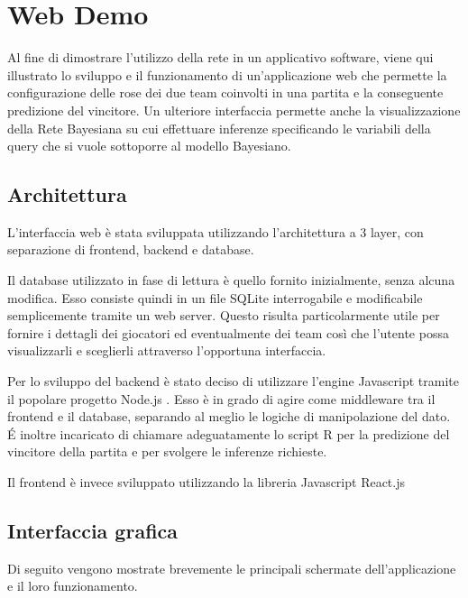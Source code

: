 \documentclass[hidelinks, 12pt]{article}
\begin{document}
\clearpage



\section{Web Demo}
\label{sec:ui}

Al fine di dimostrare l'utilizzo della rete in un applicativo software, viene qui illustrato lo sviluppo e il funzionamento di un'applicazione web che permette la configurazione delle rose dei due team coinvolti in una partita e la conseguente predizione del vincitore. Un ulteriore interfaccia permette anche la visualizzazione della Rete Bayesiana su cui effettuare inferenze specificando le variabili della query che si vuole sottoporre al modello Bayesiano.



\subsection{Architettura}

L'interfaccia web è stata sviluppata utilizzando l'architettura a 3 layer, con separazione di frontend, backend e database.

Il database utilizzato in fase di lettura è quello fornito inizialmente, senza alcuna modifica. Esso consiste quindi in un file SQLite interrogabile e modificabile semplicemente tramite un web server. Questo risulta particolarmente utile per fornire i dettagli dei giocatori ed eventualmente dei team così che l'utente possa visualizzarli e sceglierli attraverso l'opportuna interfaccia.

Per lo sviluppo del backend è stato deciso di utilizzare l'engine Javascript tramite il popolare progetto Node.js \cite{site:nodejs}. Esso è in grado di agire come middleware tra il frontend e il database, separando al meglio le logiche di manipolazione del dato. \'E inoltre incaricato di chiamare adeguatamente lo script R per la predizione del vincitore della partita e per svolgere le inferenze richieste.

Il frontend è invece sviluppato utilizzando la libreria Javascript React.js \cite{site:react}



\subsection{Interfaccia grafica}

Di seguito vengono mostrate brevemente le principali schermate dell'applicazione e il loro funzionamento.
\end{document}
